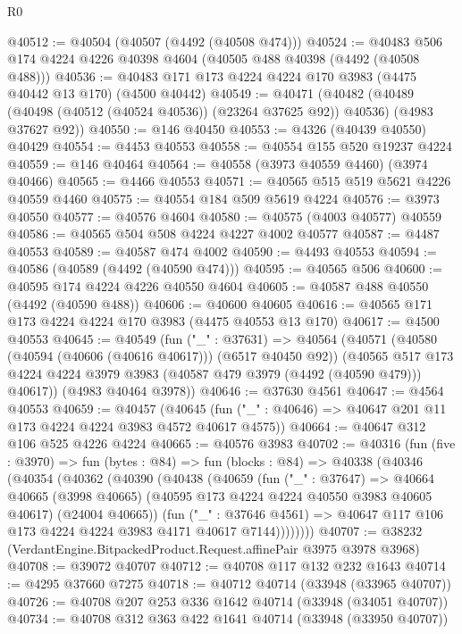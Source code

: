 \begin{lexlean}{R0}
\begin{coremodule}
@40512 := @40504 (@40507 (@4492 (@40508 @474)))
@40524 := @40483 @506 @174 @4224 @4226 @40398 @4604 (@40505 @488 @40398 (@4492 (@40508 @488)))
@40536 := @40483 @171 @173 @4224 @4224 @170 @3983 (@4475 @40442 @13 @170) (@4500 @40442)
@40549 := @40471
    (@40482
      (@40489 (@40498 (@40512 (@40524 @40536)) (@23264 @37625 @92)) @40536)
      (@4983 @37627 @92))
@40550 := @146 @40450
@40553 := @4326 (@40439 @40550) @40429
@40554 := @4453 @40553
@40558 := @40554 @155 @520 @19237 @4224
@40559 := @146 @40464
@40564 := @40558 (@3973 @40559 @4460) (@3974 @40466)
@40565 := @4466 @40553
@40571 := @40565 @515 @519 @5621 @4226 @40559 @4460
@40575 := @40554 @184 @509 @5619 @4224
@40576 := @3973 @40550
@40577 := @40576 @4604
@40580 := @40575 (@4003 @40577) @40559
@40586 := @40565 @504 @508 @4224 @4227 @4002 @40577
@40587 := @4487 @40553
@40589 := @40587 @474 @4002
@40590 := @4493 @40553
@40594 := @40586 (@40589 (@4492 (@40590 @474)))
@40595 := @40565 @506
@40600 := @40595 @174 @4224 @4226 @40550 @4604
@40605 := @40587 @488 @40550 (@4492 (@40590 @488))
@40606 := @40600 @40605
@40616 := @40565 @171 @173 @4224 @4224 @170 @3983 (@4475 @40553 @13 @170)
@40617 := @4500 @40553
@40645 := @40549
    (fun ("_" : @37631) =>
    @40564
      (@40571
        (@40580 (@40594 (@40606 (@40616 @40617))) (@6517 @40450 @92))
        (@40565 @517 @173 @4224 @4224 @3979 @3983 (@40587 @479 @3979 (@4492 (@40590 @479))) @40617))
      (@4983 @40464 @3978))
@40646 := @37630 @4561
@40647 := @4564 @40553
@40659 := @40457
    (@40645 (fun ("_" : @40646) => @40647 @201 @11 @173 @4224 @4224 @3983 @4572 @40617 @4575))
@40664 := @40647 @312 @106 @525 @4226 @4224
@40665 := @40576 @3983
@40702 := @40316
    (fun (five : @3970) =>
    fun (bytes : @84) =>
    fun (blocks : @84) =>
    @40338
      (@40346
        (@40354
          (@40362
            (@40390
              (@40438
                (@40659
                  (fun ("_" : @37647) =>
                  @40664
                    @40665
                    (@3998 @40665)
                    (@40595 @173 @4224 @4224 @40550 @3983 @40605 @40617)
                    (@24004 @40665))
                  (fun ("_" : @37646 @4561) =>
                  @40647 @117 @106 @173 @4224 @4224 @3983 @4171 @40617 @7144))))))))
@40707 := @38232 (VerdantEngine.BitpackedProduct.Request.affinePair @3975 @3978 @3968)
@40708 := @39072 @40707
@40712 := @40708 @117 @132 @232 @1643
@40714 := @4295 @37660 @7275
@40718 := @40712 @40714 (@33948 (@33965 @40707))
@40726 := @40708 @207 @253 @336 @1642 @40714 (@33948 (@34051 @40707))
@40734 := @40708 @312 @363 @422 @1641 @40714 (@33948 (@33950 @40707))

\end{coremodule}
\end{lexlean}
